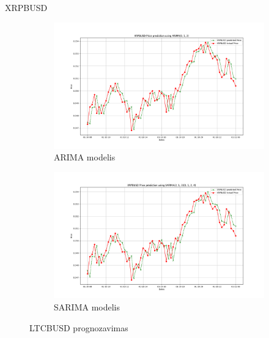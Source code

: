\documentclass{VUMIFInfKursinis}
\begin{document}
XRPBUSD
\begin{figure}[H]
  \centering
  \begin{subfigure}{.5\textwidth}
    \centering
    \includegraphics[width=\linewidth]{img/XRPBUSD__ARIMA(0, 1, 2).png}
    \caption{ARIMA modelis}
    \label{fig:xrpbusd_arima}
  \end{subfigure}%
  \begin{subfigure}{.5\textwidth}
    \centering
    \includegraphics[width=\linewidth]{img/XRPBUSD_seasonal_ARIMA(2, 1, 3)(0, 1, 2, 4).png}
    \caption{SARIMA modelis}
    \label{fig:xrpbusd_sarima}
  \end{subfigure}
  \caption{LTCBUSD prognozavimas}
  \label{fig:xrpbusd}
\end{figure}

\vspace{20pt}
\end{document}
